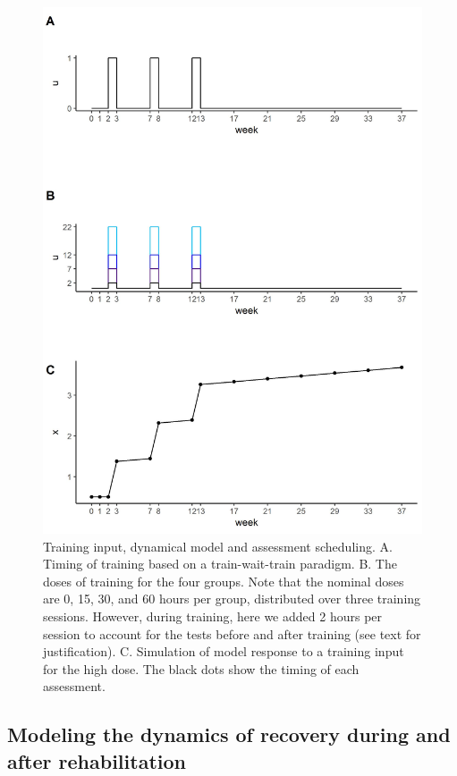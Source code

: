 \begin{figure}
	\centering
	\includegraphics[width=0.9\linewidth]{figures/dosefigure2_inputs}
	\caption[Training input, dynamical model and assessment scheduling.]{Training input, dynamical model and assessment scheduling.
		A. Timing of training based on a train-wait-train paradigm. 
		B. The doses of training for the four groups. Note that the nominal doses are 0, 15, 30, and 60 hours per group, distributed over three training sessions. However, during training, here we added 2 hours per session to account for the tests before and after training (see text for justification). 
		C. Simulation of model response to a training input for the high dose. The black dots show the timing of each assessment.}
	\label{fig:doseinputs}
\end{figure}

\subsection{Modeling the dynamics of recovery during and after rehabilitation}
